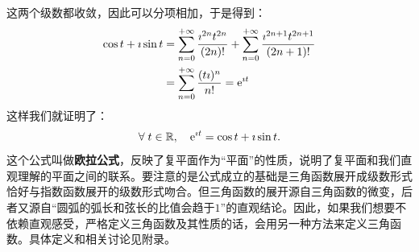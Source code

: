 \documentclass[12pt,UTF8]{ctexbook}
\begin{document}
这两个级数都收敛，因此可以分项相加，于是得到：
\begin{align*}
    \cos{t} + \imath \sin{t} &= \sum_{n=0}^{+\infty} \frac{\imath^{2n}t^{2n}}{(2n)!} + \sum_{n=0}^{+\infty} \frac{\imath^{2n+1}t^{2n+1}}{(2n+1)!} \\
    &= \sum_{n=0}^{+\infty} \frac{(t\imath)^{n}}{n!} = \mathrm{e}^{\imath t}
\end{align*}
这样我们就证明了：
$$ \forall \; t\in\mathbb{R}, \quad \mathrm{e}^{\imath t} = \cos{t} + \imath \sin{t}. $$
这个公式叫做\textbf{欧拉公式}，反映了复平面作为“平面”的性质，说明了复平面和我们直观理解的平面之间的联系。要注意的是公式成立的基础是三角函数展开成级数形式恰好与指数函数展开的级数形式吻合。但三角函数的展开源自三角函数的微变，后者又源自“圆弧的弧长和弦长的比值会趋于$1$”的直观结论。因此，如果我们想要不依赖直观感受，严格定义三角函数及其性质的话，会用另一种方法来定义三角函数。具体定义和相关讨论见附录。
\end{document}
